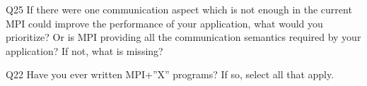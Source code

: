 \begin{description}%
\item{Q25} If there were one communication aspect which is not enough in the current MPI could improve the performance of your application, what would you prioritize? Or is MPI providing all the communication semantics required by your application? If not, what is missing?%
\item{Q22} Have you ever written MPI+”X” programs? If so, select all that apply.%
\end{description}%
